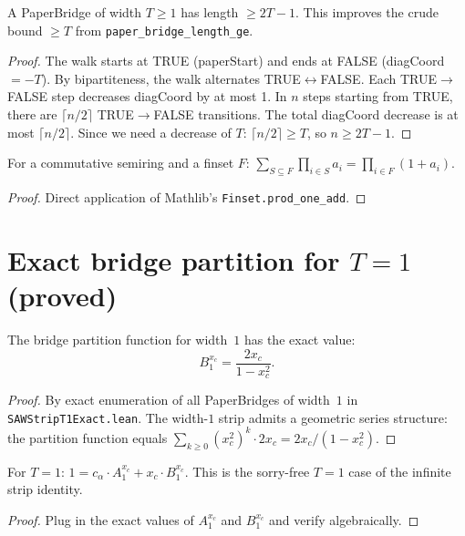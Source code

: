 \begin{lemma}
\begin{enumerate}
\begin{lemma}
\label{lem:bridge-tight-length}
\leanok
{}
  A PaperBridge of width $T \geq 1$ has length $\geq 2T-1$.
  This improves the crude bound $\geq T$ from \texttt{paper\_bridge\_length\_ge}.
\end{lemma}
\begin{proof}
\leanok
  The walk starts at TRUE (paperStart) and ends at FALSE (diagCoord $= -T$).
  By bipartiteness, the walk alternates TRUE$\leftrightarrow$FALSE.
  Each TRUE$\to$FALSE step decreases diagCoord by at most 1.
  In $n$ steps starting from TRUE, there are $\lceil n/2 \rceil$
  TRUE$\to$FALSE transitions. The total diagCoord decrease is at most
  $\lceil n/2 \rceil$. Since we need a decrease of $T$:
  $\lceil n/2 \rceil \geq T$, so $n \geq 2T-1$.
\end{proof}

\begin{lemma}
\label{lem:powerset-prod}
\leanok
  For a commutative semiring and a finset $F$:
  $\sum_{S \subseteq F} \prod_{i \in S} a_i = \prod_{i \in F} (1 + a_i)$.
\end{lemma}
\begin{proof}
\leanok
  Direct application of Mathlib's \texttt{Finset.prod\_one\_add}.
\end{proof}

\section{Exact bridge partition for $T=1$ (proved)}\label{sec:bridge-T1-exact}

\begin{theorem}[Exact bridge partition for $T=1$]
\label{thm:bridge-partition-1-exact}
\leanok
  The bridge partition function for width~$1$ has the exact value:
  \[
    B_1^{x_c} = \frac{2x_c}{1 - x_c^2}.
  \]
\end{theorem}
\begin{proof}
\leanok
  By exact enumeration of all PaperBridges of width~$1$ in
  \texttt{SAWStripT1Exact.lean}. The width-$1$ strip admits a geometric
  series structure: the partition function equals $\sum_{k\geq 0}(x_c^2)^k\cdot 2x_c
  = 2x_c/(1-x_c^2)$.
\end{proof}

\begin{theorem}[$T=1$ infinite strip identity (proved)]
\label{thm:inf-strip-T1-proved}
\leanok
{}
  For $T=1$: $1 = c_\alpha \cdot A_1^{x_c} + x_c \cdot B_1^{x_c}$.
  This is the sorry-free $T{=}1$ case of the infinite strip identity.
\end{theorem}
\begin{proof}
\leanok
  Plug in the exact values of $A_1^{x_c}$ and $B_1^{x_c}$ and verify
  algebraically.
\end{proof}


\end{enumerate}
\end{lemma}

